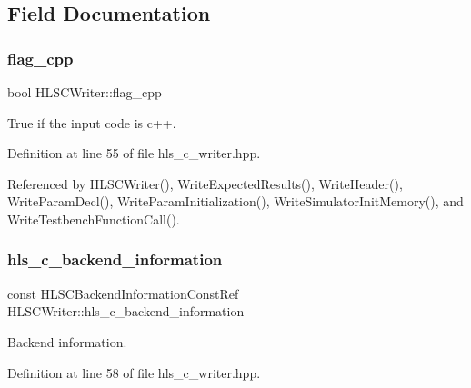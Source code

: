 \subsection{Field Documentation}
\mbox{\label{classHLSCWriter_a7012939ffcb42f0ae795006e4f7fd6aa}} 
\subsubsection{\texorpdfstring{flag\+\_\+cpp}{flag\_cpp}}
{\footnotesize\ttfamily bool H\+L\+S\+C\+Writer\+::flag\+\_\+cpp\hspace{0.3cm}{\ttfamily [protected]}}



True if the input code is c++. 



Definition at line 55 of file hls\+\_\+c\+\_\+writer.\+hpp.



Referenced by H\+L\+S\+C\+Writer(), Write\+Expected\+Results(), Write\+Header(), Write\+Param\+Decl(), Write\+Param\+Initialization(), Write\+Simulator\+Init\+Memory(), and Write\+Testbench\+Function\+Call().

\mbox{\label{classHLSCWriter_a885e26e7963d6efaa29b0ab47864ab8b}} 
\subsubsection{\texorpdfstring{hls\+\_\+c\+\_\+backend\+\_\+information}{hls\_c\_backend\_information}}
{\footnotesize\ttfamily const H\+L\+S\+C\+Backend\+Information\+Const\+Ref H\+L\+S\+C\+Writer\+::hls\+\_\+c\+\_\+backend\+\_\+information\hspace{0.3cm}{\ttfamily [protected]}}



Backend information. 



Definition at line 58 of file hls\+\_\+c\+\_\+writer.\+hpp.



